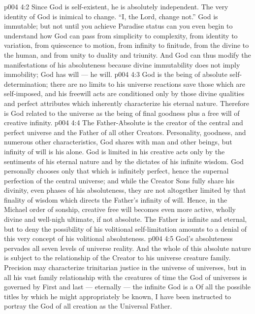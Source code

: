 \vs p004 4:2 Since God is self\hyp{}existent, he is absolutely independent. The very identity of God is inimical to change. “I, the Lord, change not.” God is immutable; but not until you achieve Paradise status can you even begin to understand how God can pass from simplicity to complexity, from identity to variation, from quiescence to motion, from infinity to finitude, from the divine to the human, and from unity to duality and triunity. And God can thus modify the manifestations of his absoluteness because divine immutability does not imply immobility; God has will --- he  will.
\vs p004 4:3 God is the being of absolute self\hyp{}determination; there are no limits to his universe reactions save those which are self\hyp{}imposed, and his freewill acts are conditioned only by those divine qualities and perfect attributes which inherently characterize his eternal nature. Therefore is God related to the universe as the being of final goodness plus a free will of creative infinity.
\vs p004 4:4 The Father\hyp{}Absolute is the creator of the central and perfect universe and the Father of all other Creators. Personality, goodness, and numerous other characteristics, God shares with man and other beings, but infinity of will is his alone. God is limited in his creative acts only by the sentiments of his eternal nature and by the dictates of his infinite wisdom. God personally chooses only that which is infinitely perfect, hence the supernal perfection of the central universe; and while the Creator Sons fully share his divinity, even phases of his absoluteness, they are not altogether limited by that finality of wisdom which directs the Father’s infinity of will. Hence, in the Michael order of sonship, creative free will becomes even more active, wholly divine and well\hyp{}nigh ultimate, if not absolute. The Father is infinite and eternal, but to deny the possibility of his volitional self\hyp{}limitation amounts to a denial of this very concept of his volitional absoluteness.
\vs p004 4:5 \pc God’s absoluteness pervades all seven levels of universe reality. And the whole of this absolute nature is subject to the relationship of the Creator to his universe creature family. Precision may characterize trinitarian justice in the universe of universes, but in all his vast family relationship with the creatures of time the God of universes is governed by  First and last --- eternally --- the infinite God is a  Of all the possible titles by which he might appropriately be known, I have been instructed to portray the God of all creation as the Universal Father.
